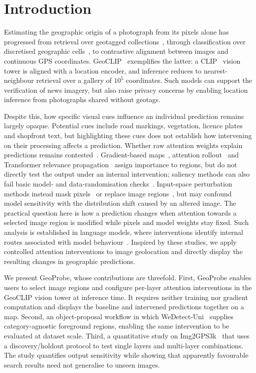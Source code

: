 \section{Introduction}

Estimating the geographic origin of a photograph from its pixels alone has
progressed from retrieval over geotagged collections~\cite{hays2008im2gps},
through classification over discretised geographic
cells~\cite{weyand2016planet,pramanick2022translocator}, to contrastive
alignment between images and continuous GPS coordinates.
GeoCLIP~\cite{cepeda2023geoclip} exemplifies the latter: a
CLIP~\cite{radford2021clip} vision tower is aligned with a location encoder,
and inference reduces to nearest-neighbour retrieval over a gallery of
$10^{5}$ coordinates. Such models can support the verification of news imagery, but also raise privacy concerns by enabling location inference from photographs shared without geotags.

Despite this, how specific visual cues influence an individual prediction remains largely opaque. Potential cues include road markings, vegetation, licence plates and shopfront text, but highlighting these cues does not establish how intervening on their processing affects a prediction.
Whether raw attention weights explain predictions remains
contested~\cite{jain2019attention,wiegreffe2019attention}. Gradient-based
maps~\cite{selvaraju2017gradcam}, attention rollout~\cite{abnar2020rollout}
and Transformer relevance propagation~\cite{chefer2021transformer} assign
importance to regions, but do not directly test the output under an internal
intervention; saliency methods can also fail basic model- and data-randomisation
checks~\cite{adebayo2018sanity}. Input-space perturbation methods instead mask
pixels~\cite{petsiuk2018rise} or replace image regions~\cite{goyal2019counterfactual},
but may confound model sensitivity with the distribution shift caused by an
altered image. The practical question here is how a prediction changes when attention towards a selected image region is modified while pixels and model weights stay fixed.
Such analysis is established in language models, where interventions identify
internal routes associated with model behaviour~\cite{vig2020causal,meng2022rome,geva2023dissecting}.
Inspired by these studies, we apply controlled attention interventions to image geolocation and directly display the resulting changes in geographic predictions.

We present GeoProbe, whose contributions are threefold. First, GeoProbe enables users to select image regions and configure per-layer attention interventions in the GeoCLIP vision tower at inference time. It requires neither training nor gradient computation and displays the baseline and intervened predictions together on a map. Second, an
object-proposal workflow in which WeDetect-Uni~\cite{fu2026wedetect}
supplies category-agnostic foreground regions, enabling the same intervention
to be evaluated at dataset scale.
Third, a quantitative study on Img2GPS3k~\cite{vo2017revisiting} that uses a
discovery/holdout protocol to test single layers and multi-layer
combinations. The study quantifies output sensitivity while showing that
apparently favourable search results need not generalise to unseen images.
